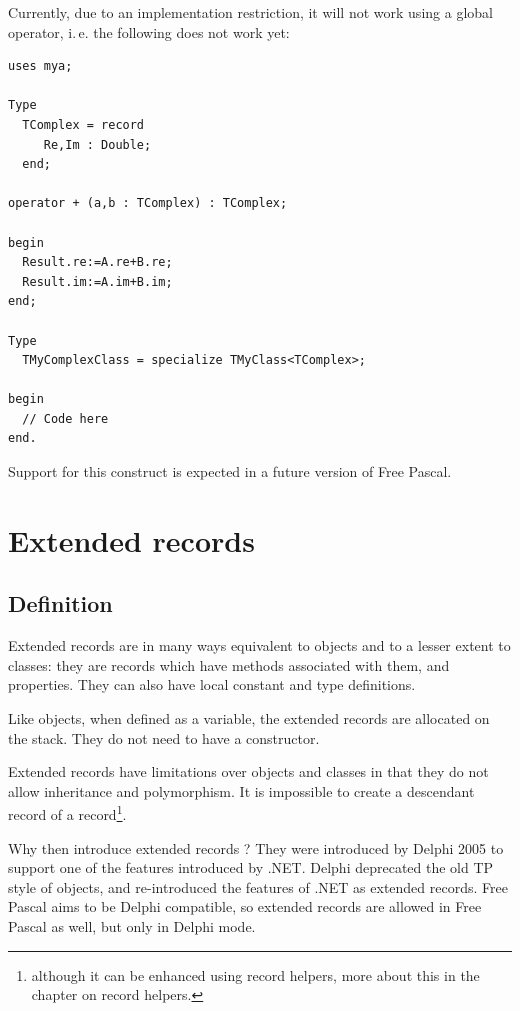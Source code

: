 Currently, due to an implementation restriction, it will not work using a global operator, i.\,e. the following does not work yet:
\begin{verbatim}
uses mya;

Type
  TComplex = record
     Re,Im : Double;
  end;

operator + (a,b : TComplex) : TComplex;

begin
  Result.re:=A.re+B.re;
  Result.im:=A.im+B.im;
end;

Type
  TMyComplexClass = specialize TMyClass<TComplex>;

begin
  // Code here
end.
\end{verbatim}
Support for this construct is expected in a future version of Free Pascal.


\chapter{Extended records}
\label{ch:ExtendedRecords}

\section{Definition}
Extended records are in many ways equivalent to objects and to a lesser
extent to classes: they are records which have methods associated with
them, and properties. They can also have local constant and type definitions. 

Like objects, when defined as a variable, the extended records are
allocated on the stack. They do not need to have a constructor.

Extended records have limitations over objects and classes in that they
do not allow inheritance and polymorphism. It is impossible to create a
descendant record of a record\footnote{although it can be enhanced using record
helpers, more about this in the chapter on record helpers.}.

Why then introduce extended records ? They were introduced by Delphi
2005 to support one of the features introduced by .NET. Delphi deprecated
the old TP style of objects, and re-introduced the features of .NET as
extended records. Free Pascal aims to be Delphi
compatible, so extended records are allowed in Free Pascal as well,
but only in Delphi mode.

